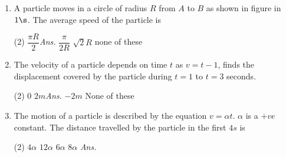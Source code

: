 \documentclass{article}
\newcommand{\ans}{\textcolor{red!95}{\textit{\quad Ans.}}}
\begin{document}
\begin{enumerate}
\item A particle moves in a circle of radius $R$ from $A$ to $B$ as shown in figure in $1\s$. The average speed of the particle is
    \begin{center}
    \end{center}
    \begin{tasks}(2)
    		\task $\dfrac{\pi R}{2}$\ans
        \task $\dfrac{\pi}{2R}$
        \task $\sqrt{2}R$
        \task none of these
    \end{tasks}

\item The velocity of a particle depends on time $t$ as $v=t-1$, finds the displacement covered by the particle during $t=1$ to $t=3$ seconds.
    \begin{center}
    \end{center}

\begin{tasks}(2)
	\task $0$
    \task $2 m$\ans
    \task $-2 m$
    \task None of these
\end{tasks}

\item The motion of a particle is described by the equation $v=\alpha t$. $\alpha$ is a $+ve$ constant. The distance travelled by the particle in the first $4 s$ is
    \begin{tasks}(2)
    \task $4\alpha$
    \task $12\alpha$
    \task $6\alpha$
    \task $8\alpha$ \ans
    \end{tasks}


\end{enumerate}
\end{document}
